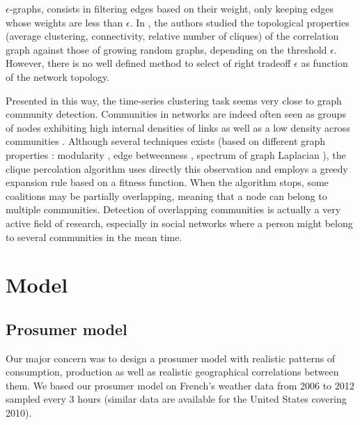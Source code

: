 \documentclass[conference]{IEEEtran}
\begin{document}
$\epsilon$-graphs, consists in filtering edges based on their weight, only keeping edges whose weights are less than $ \epsilon $. In \cite{Garas2008, Onnela2004}, the authors studied the topological properties (average clustering, connectivity, relative number of cliques) of the correlation graph against those of growing random graphs, depending on the threshold $ \epsilon $. However, there is no well defined method to select of right tradeoff $ \epsilon $ as function of the network topology.

Presented in this way, the time-series clustering task seems very close to graph community detection. Communities in networks are indeed often seen as groups of nodes exhibiting high internal densities of links as well as a low density across communities \cite{Newmanb}. Although several techniques exists (based on different graph properties : modularity \cite{Newmanb}, edge betweenness \cite{Girvan2002}, spectrum of graph Laplacian \cite{Newman}), the clique percolation algorithm \cite{Lancichinetti} uses directly this observation and employs a greedy expansion rule based on a fitness function. When the algorithm stops, some coalitions may be partially overlapping, meaning that a node can belong to multiple communities. Detection of overlapping communities is actually a very active field of research, especially in social networks where a person might belong to several communities in the mean time.

%
%

\section{Model}
\label{sec:model}
\subsection{Prosumer model}\label{subsec:ProsumerModel}

Our major concern was to design a prosumer model with realistic patterns of consumption, production as well as realistic geographical correlations between them. We based our prosumer model on French's weather data from 2006 to 2012 sampled every 3 hours \cite{Infoclimat} (similar data are available for the United States covering 2010\cite{NCDC}). 
\end{document}
